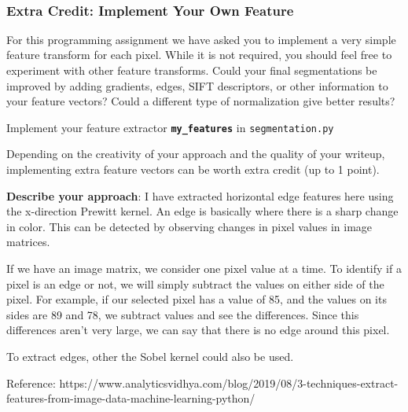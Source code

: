 \documentclass[11pt]{article}
\begin{document}
    \begin{center}
    \end{center}
    { \hspace*{\fill} \\}
    
    \subsubsection{Extra Credit: Implement Your Own
Feature}\label{extra-credit-implement-your-own-feature}

For this programming assignment we have asked you to implement a very
simple feature transform for each pixel. While it is not required, you
should feel free to experiment with other feature transforms. Could your
final segmentations be improved by adding gradients, edges, SIFT
descriptors, or other information to your feature vectors? Could a
different type of normalization give better results?

Implement your feature extractor \textbf{\texttt{my\_features}} in
\texttt{segmentation.py}

Depending on the creativity of your approach and the quality of your
writeup, implementing extra feature vectors can be worth extra credit
(up to 1 point).

    \textbf{Describe your approach}: I have extracted horizontal edge
features here using the x-direction Prewitt kernel. An edge is basically
where there is a sharp change in color. This can be detected by
observing changes in pixel values in image matrices.

If we have an image matrix, we consider one pixel value at a time. To
identify if a pixel is an edge or not, we will simply subtract the
values on either side of the pixel. For example, if our selected pixel
has a value of 85, and the values on its sides are 89 and 78, we
subtract values and see the differences. Since this differences aren't
very large, we can say that there is no edge around this pixel.

To extract edges, other the Sobel kernel could also be used.

Reference:
https://www.analyticsvidhya.com/blog/2019/08/3-techniques-extract-features-from-image-data-machine-learning-python/
\end{document}

